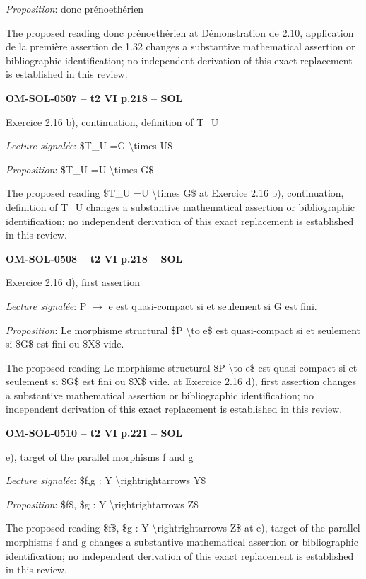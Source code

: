 \emph{Proposition}: donc prénoethérien\par
The proposed reading donc prénoethérien at Démonstration de 2.10, application de la première assertion de 1.32 changes a substantive mathematical assertion or bibliographic identification; no independent derivation of this exact replacement is established in this review.\par
\par\noindent\textbf{OM-SOL-0507 -- t2 VI p.218 -- SOL}\par
Exercice 2.16 b), continuation, definition of T\_U\par
\emph{Lecture signalée}: \$T\_U =\allowbreak  G \textbackslash{}times U\$\par
\emph{Proposition}: \$T\_U =\allowbreak  U \textbackslash{}times G\$\par
The proposed reading \$T\_U =\allowbreak  U \textbackslash{}times G\$ at Exercice 2.16 b), continuation, definition of T\_U changes a substantive mathematical assertion or bibliographic identification; no independent derivation of this exact replacement is established in this review.\par
\par\noindent\textbf{OM-SOL-0508 -- t2 VI p.218 -- SOL}\par
Exercice 2.16 d), first assertion\par
\emph{Lecture signalée}: P \ensuremath{\to} e est quasi-compact si et seulement si G est fini.\par
\emph{Proposition}: Le morphisme structural \$P \textbackslash{}to e\$ est quasi-compact si et seulement si \$G\$ est fini ou \$X\$ vide.\par
The proposed reading Le morphisme structural \$P \textbackslash{}to e\$ est quasi-compact si et seulement si \$G\$ est fini ou \$X\$ vide. at Exercice 2.16 d), first assertion changes a substantive mathematical assertion or bibliographic identification; no independent derivation of this exact replacement is established in this review.\par
\par\noindent\textbf{OM-SOL-0510 -- t2 VI p.221 -- SOL}\par
e), target of the parallel morphisms f and g\par
\emph{Lecture signalée}: \$f,g : Y \textbackslash{}rightrightarrows Y\$\par
\emph{Proposition}: \$f\$, \$g : Y \textbackslash{}rightrightarrows Z\$\par
The proposed reading \$f\$, \$g : Y \textbackslash{}rightrightarrows Z\$ at e), target of the parallel morphisms f and g changes a substantive mathematical assertion or bibliographic identification; no independent derivation of this exact replacement is established in this review.\par
